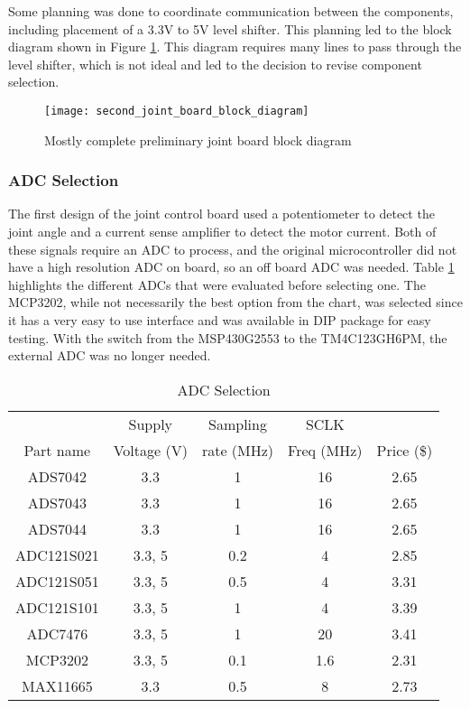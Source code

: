\noindent Some planning was done to coordinate communication between the components, including placement of a 3.3V to 5V level shifter. This planning led to the block diagram shown in Figure \ref{fig:2nd_joint_board_block}. This diagram requires many lines to pass through the level shifter, which is not ideal and led to the decision to revise component selection.

\begin{figure}[H]
	\centering
	\texttt{[image: second\_joint\_board\_block\_diagram]}
	\caption{Mostly complete preliminary joint board block diagram}
	\label{fig:2nd_joint_board_block}
\end{figure}

\subsubsection{ADC Selection}
The first design of the joint control board used a potentiometer to detect the joint angle and a current sense amplifier to detect the motor current. Both of these signals require an ADC to process, and the original microcontroller did not have a high resolution ADC on board, so an off board ADC was needed. Table \ref{tbl:ADC Selection} highlights the different ADCs that were evaluated before selecting one. The MCP3202, while not necessarily the best option from the chart, was selected since it has a very easy to use interface and was available in DIP package for easy testing. With the switch from the MSP430G2553 to the TM4C123GH6PM, the external ADC was no longer needed.

\begin{table}[H]
	\centering
	\caption{ADC Selection}
	
	\begin{tabular}{|c|c|c|c|c|}
		\hline
		& Supply & Sampling & SCLK & \\
		Part name & Voltage (V) & rate (MHz) & Freq (MHz) & Price (\$) \\
		\hline
		ADS7042 & 3.3 & 1 & 16 & 2.65 \\
		
		ADS7043 & 3.3 & 1 & 16 & 2.65 \\
		
		ADS7044 & 3.3 & 1 & 16 & 2.65 \\
		
		ADC121S021 & 3.3, 5 & 0.2 & 4 & 2.85 \\
		
		ADC121S051 & 3.3, 5 & 0.5 & 4 & 3.31 \\
		
		ADC121S101 & 3.3, 5 & 1 & 4 & 3.39 \\
		
		ADC7476 & 3.3, 5 & 1 & 20 & 3.41 \\
		
		MCP3202 & 3.3, 5 & 0.1 & 1.6 & 2.31 \\
		
		MAX11665 & 3.3 & 0.5 & 8 & 2.73 \\
		\hline
	\end{tabular}
	
	\label{tbl:ADC Selection}
\end{table}

